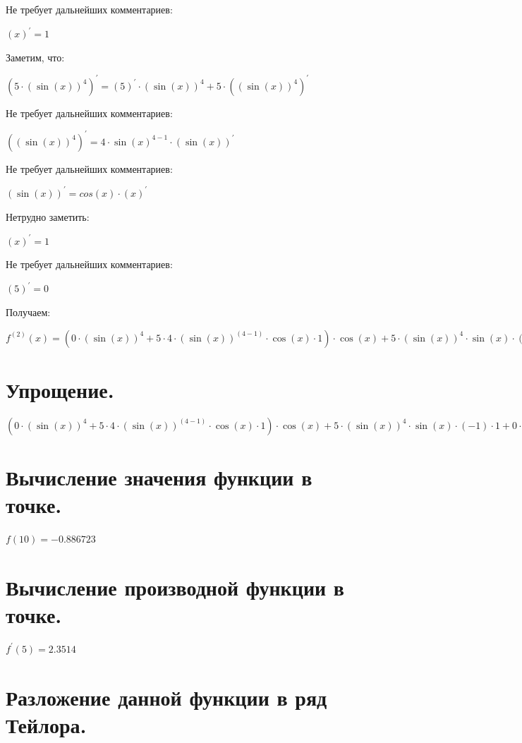 \documentclass{article}
\begin{document}
Не требует дальнейших комментариев:

${(x)}^{'} = 1$

Заметим, что:

${(5 \cdot {(\sin(x))}^{4})}^{'} = {(5)}^{'}\cdot {(\sin(x))}^{4} + 5\cdot {({(\sin(x))}^{4})}^{'}$

Не требует дальнейших комментариев:

${({(\sin(x))}^{4})}^{'} = 4\cdot {\sin(x)}^{4 - 1} \cdot{(\sin(x))}^{'}$

Не требует дальнейших комментариев:

${(\sin(x))}^{'} = cos(x) \cdot{(x)}^{'}$

Нетрудно заметить:

${(x)}^{'} = 1$

Не требует дальнейших комментариев:

${(5)}^{'} = 0$

Получаем:

$ f^{(2)}(x) = (0 \cdot {(\sin(x))}^{4} + 5 \cdot 4 \cdot {(\sin(x))}^{(4 - 1)} \cdot \cos(x) \cdot 1) \cdot \cos(x) + 5 \cdot {(\sin(x))}^{4} \cdot \sin(x) \cdot (-1) \cdot 1 + 0 \cdot \sin(x) + (-1) \cdot \cos(x) \cdot 1$

\section{Упрощение.}

$(0 \cdot {(\sin(x))}^{4} + 5 \cdot 4 \cdot {(\sin(x))}^{(4 - 1)} \cdot \cos(x) \cdot 1) \cdot \cos(x) + 5 \cdot {(\sin(x))}^{4} \cdot \sin(x) \cdot (-1) \cdot 1 + 0 \cdot \sin(x) + (-1) \cdot \cos(x) \cdot 1 = 5 \cdot 4 \cdot {(\sin(x))}^{3} \cdot \cos(x) \cdot \cos(x) + 5 \cdot {(\sin(x))}^{4} \cdot (-1) \cdot \sin(x) + (-1) \cdot \cos(x)$
\section{Вычисление значения функции в точке.}

$ f(10) = -0.886723 $
\section{Вычисление производной функции в точке.}

$ f^{'}(5) = 2.3514 $
\section{Разложение данной функции в ряд Тейлора.}
\end{document}
